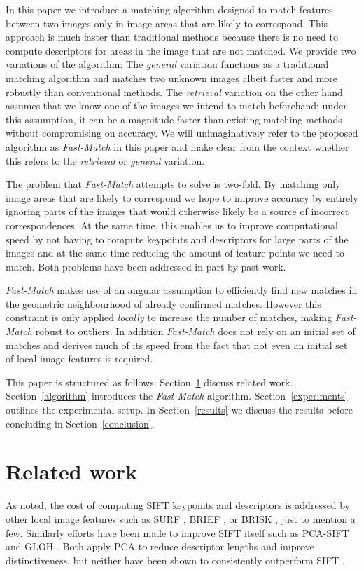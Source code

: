 \documentclass[runningheads]{llncs}
\begin{document}
In this paper we introduce a matching algorithm designed to match features between two images only in image areas that are likely to correspond. This approach is much faster than traditional methods because there is no need to compute descriptors for areas in the image that are not matched. We provide two variations of the algorithm: The \emph{general} variation functions as a traditional matching algorithm and matches two unknown images albeit faster and more robustly than conventional methods. The \emph{retrieval} variation on the other hand assumes that we know one of the images we intend to match beforehand; under this assumption, it can be a magnitude faster than existing matching methods without compromising on accuracy. We will unimaginatively refer to the proposed algorithm as \emph{Fast-Match} in this paper and make clear from the context whether this refers to the \emph{retrieval} or \emph{general} variation.

The problem that \emph{Fast-Match} attempts to solve is two-fold. By matching only image areas that are likely to correspond we hope to improve accuracy by entirely ignoring parts of the images that would otherwise likely be a source of incorrect correspondences. At the same time, this enables us to improve computational speed by not having to compute keypoints and descriptors for large parts of the images and at the same time reducing the amount of feature points we need to match. Both problems have been addressed in part by past work. 

\emph{Fast-Match} makes use of an angular assumption to efficiently find new matches in the geometric neighbourhood of already confirmed matches. However this constraint is only applied \emph{locally} to increase the number of matches, making \emph{Fast-Match} robust to outliers. In addition \emph{Fast-Match} does not rely on an initial set of matches and derives much of its speed from the fact that not even an initial set of local image features is required.

This paper is structured as follows: Section~\ref{related} discuss related work. Section~\ref{algorithm} introduces the \emph{Fast-Match} algorithm. Section~\ref{experiments} outlines the experimental setup. In Section~\ref{results} we discuss the results before concluding in Section~\ref{conclusion}.

\section{Related work}
\label{related}
%
As noted, the cost of computing SIFT keypoints and descriptors is addressed by other local image features such as SURF \cite{bay2006surf}, BRIEF \cite{calonder2010brief}, or BRISK \cite{leutenegger2011brisk}, just to mention a few. Similarly efforts have been made to improve SIFT itself such as PCA-SIFT \cite{ke2004pca} and GLOH \cite{mikolajczyk2005performance}. Both apply PCA to reduce descriptor lengths and improve distinctiveness, but neither have been shown to consistently outperform SIFT 
\cite{mikolajczyk2005performance,li2008comprehensive}. 
\end{document}

